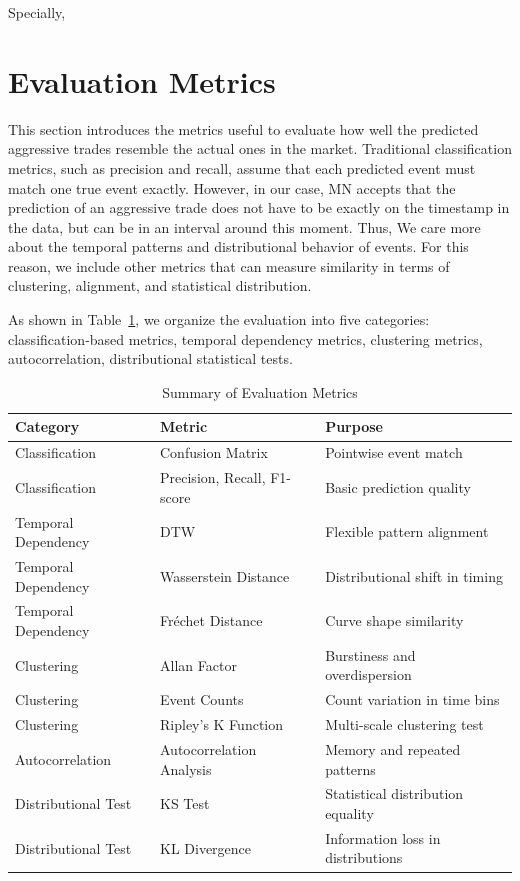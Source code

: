 Specially, 


\section{Evaluation Metrics} \label{sec:evaluation-metrics}
This section introduces the metrics useful to evaluate how well the predicted aggressive trades resemble the actual ones in the market. Traditional classification metrics, such as precision and recall, assume that each predicted event must match one true event exactly. However, in our case, MN accepts that the prediction of an aggressive trade does not have to be exactly on the timestamp in the data, but can be in an interval around this moment. Thus, We care more about the temporal patterns and distributional behavior of events. For this reason, we include other metrics that can measure similarity in terms of clustering, alignment, and statistical distribution.

As shown in Table~\ref{tb:Evaluation Metrics}, we organize the evaluation into five categories: classification-based metrics, temporal dependency metrics, clustering metrics, autocorrelation, distributional statistical tests.

\begin{table}[h]
\centering
\begin{tabular}{|l|l|l|}
\hline
\textbf{Category} & \textbf{Metric} & \textbf{Purpose} \\
\hline
Classification & Confusion Matrix & Pointwise event match \\
Classification & Precision, Recall, F1-score & Basic prediction quality \\
Temporal Dependency & DTW & Flexible pattern alignment \\
Temporal Dependency & Wasserstein Distance & Distributional shift in timing \\
Temporal Dependency & Fréchet Distance & Curve shape similarity \\
Clustering & Allan Factor & Burstiness and overdispersion \\
Clustering & Event Counts & Count variation in time bins \\
Clustering & Ripley's K Function & Multi-scale clustering test \\
Autocorrelation & Autocorrelation Analysis & Memory and repeated patterns \\
Distributional Test & KS Test & Statistical distribution equality \\
Distributional Test & KL Divergence & Information loss in distributions \\
\hline
\end{tabular}
\caption{Summary of Evaluation Metrics}\label{tb:Evaluation Metrics}
\end{table}

